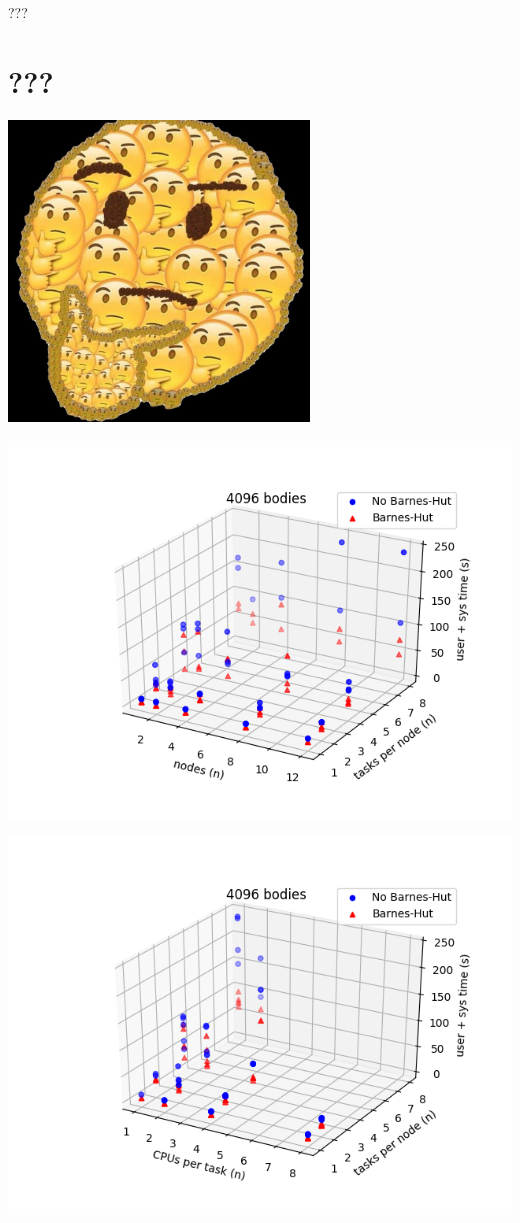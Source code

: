\documentclass{beamer}
\begin{document}
\begin{frame}[allowframebreaks]{???}
\section{???}

\includegraphics[width=8cm]{hmm}

\framebreak

\includegraphics[width=\linewidth]{4096-nodes-tasksPerNode}

\framebreak

\includegraphics[width=\linewidth]{4096-cpusPerTask-tasksPerNode}


\end{frame}
\end{document}
